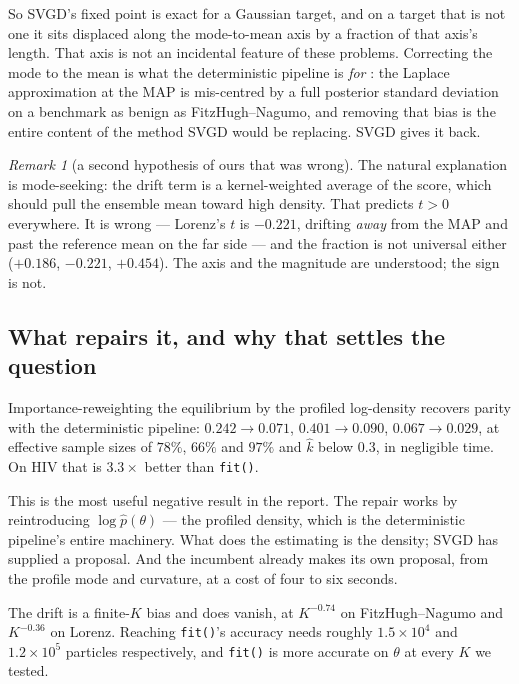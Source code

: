 \documentclass[11pt]{article}
\newcommand{\code}[1]{\texttt{\small #1}}
\newcommand{\khat}{\widehat{k}}
\theoremstyle{remark}
\newtheorem{remark}{Remark}
\begin{document}
So SVGD's fixed point is exact for a Gaussian target, and on a target that is not one it sits
displaced along the mode-to-mean axis by a fraction of that axis's length. That axis is not an
incidental feature of these problems. Correcting the mode to the mean is what the deterministic
pipeline is \emph{for} \cite{companion1}: the Laplace approximation at the MAP is mis-centred by a
full posterior standard deviation on a benchmark as benign as FitzHugh--Nagumo, and removing that
bias is the entire content of the method SVGD would be replacing. SVGD gives it back.

\begin{remark}[a second hypothesis of ours that was wrong]
The natural explanation is mode-seeking: the drift term is a kernel-weighted average of the score,
which should pull the ensemble mean toward high density. That predicts $t > 0$ everywhere. It is
wrong --- Lorenz's $t$ is $-0.221$, drifting \emph{away} from the MAP and past the reference mean
on the far side --- and the fraction is not universal either ($+0.186$, $-0.221$, $+0.454$). The
axis and the magnitude are understood; the sign is not.
\end{remark}

\subsection{What repairs it, and why that settles the question}

Importance-reweighting the equilibrium by the profiled log-density recovers parity with the
deterministic pipeline: $0.242 \to 0.071$, $0.401 \to 0.090$, $0.067 \to 0.029$, at effective
sample sizes of $78\%$, $66\%$ and $97\%$ and $\khat$ below $0.3$, in negligible time. On HIV that
is $3.3\times$ better than \code{fit()}.

This is the most useful negative result in the report. The repair works by reintroducing
$\log \hat p(\theta)$ --- the profiled density, which is the deterministic pipeline's entire
machinery. What does the estimating is the density; SVGD has supplied a proposal. And the
incumbent already makes its own proposal, from the profile mode and curvature, at a cost of four to
six seconds.

The drift is a finite-$K$ bias and does vanish, at $K^{-0.74}$ on FitzHugh--Nagumo and $K^{-0.36}$
on Lorenz. Reaching \code{fit()}'s accuracy needs roughly $1.5\times10^{4}$ and $1.2\times10^{5}$
particles respectively, and \code{fit()} is more accurate on $\theta$ at every $K$ we tested.
\end{document}

